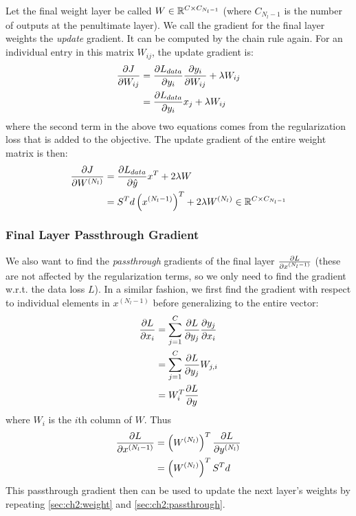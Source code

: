 Let the final weight layer be called $W \in \reals[C\x C_{N_l - 1}]$ (where $C_{N_l -1}$ is the number of outputs at the 
penultimate layer). We call the gradient for the final layer weights the \emph{update} gradient.
It can be computed by the chain rule again. For an individual entry in this matrix $W_{ij}$, the update gradient is:
\begin{align}
  \dydx{J}{W_{ij}} &= \dydx{L_{data}}{y_i} \dydx{y_i}{W_{ij}} + \lambda W_{ij} \\
                   &= \dydx{L_{data}}{y_i} x_j + \lambda W_{ij}
\end{align}
where the second term in the above two equations comes from the regularization
loss that is added to the objective. The update gradient of the entire weight matrix is
then:
\begin{align}
  \dydx{J}{W^{(N_l)}} &= \dydx{L_{data}}{\hat{y}} x^T +2\lambda W \\
                    &= S^T d \left(x^{(N_l-1)}\right)^T + 2\lambda W^{(N_l)} \in \reals[C \x C_{N_l-1}]
\end{align}

\subsubsection{Final Layer Passthrough Gradient} \label{sec:ch2:passthrough}
We also want to find the \emph{passthrough} gradients of the final
layer $\dydx{L}{x^{(N_l-1)}}$ (these are not affected by the regularization
terms, so we only need to find the gradient w.r.t. the data loss $L$). In a
similar fashion, we first find the gradient with respect to individual elements
in $x^{(N_l-1)}$ before generalizing to the entire vector:
\begin{align}
  \dydx{L}{x_i} &= \sum_{j=1}^{C} \dydx{L}{y_j} \dydx{y_j}{x_i} \\
                &= \sum_{j=1}^{C} \dydx{L}{y_j} W_{j,i} \\
                &= W_{i}^T\dydx{L}{y} \\
\end{align}
where $W_i$ is the $i$th column of $W$. Thus
\begin{align}
  \dydx{L}{x^{(N_l-1)}} &= \left(W^{(N_l)}\right)^T \dydx{L}{y^{(N_l)}} \\
                      &= \left( W^{(N_l)} \right)^T S^T d
\end{align}
This passthrough gradient then can be used to update the next layer's weights by
repeating \autoref{sec:ch2:weight} and \autoref{sec:ch2:passthrough}.

